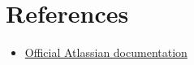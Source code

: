 \newpage
\section{References}

\begin{itemize}
    \item \href{https://support.atlassian.com/jira-service-management-cloud/docs/use-advanced-search-with-jira-query-language-jql/}{Official Atlassian documentation}
\end{itemize}